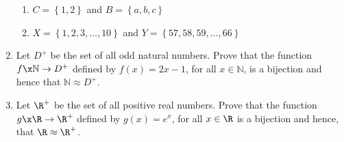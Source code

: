 \begin{previewactivity}
\begin{enumerate}
\begin{enumerate}
\item $C = \left\{ 1, 2 \right\}$ and $B = \left\{ a, b, c \right\}$  

\item $X = \left\{ 1, 2, 3, \ldots, 10 \right\}$   and 
$Y = \left\{ 57, 58, 59, \ldots, 66 \right\}$
\end{enumerate}  

\item Let $D^+$ be the set of all odd natural numbers.   Prove that the function \linebreak
$f\x \mathbb{N} \to D^+$ defined by 
$f \left( x \right) = 2x - 1$, for all $x \in \mathbb{N}$,  is a bijection and hence that $\mathbb{N} \approx D^+$. 
\label{PA:equivalentsets5}%


\item Let $\R^+$ be the set of all positive real numbers.  Prove that the function 
\linebreak
$g\x \R \to \R^+$ defined by $g (x ) = e^x$, for all $x \in \R$ is a bijection and hence, that 
$\R \approx \R^+$.
\end{enumerate}
\end{previewactivity}
\hbreak

\endinput
